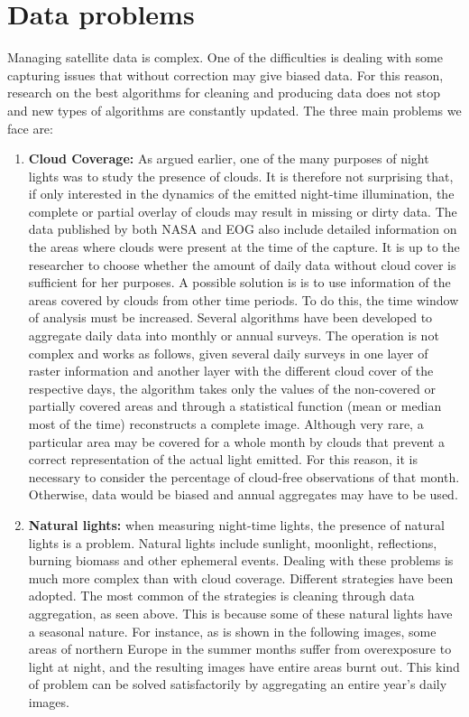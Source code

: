 \section{Data problems}
Managing satellite data is complex. One of the difficulties is dealing with some capturing issues that without correction may give biased data. For this reason, research on the best algorithms for cleaning and producing data does not stop and new types of algorithms are constantly updated. The three main problems we face are:
\begin{enumerate}
\item \textbf{Cloud Coverage:} As argued earlier, one of the many purposes of night lights was to study the presence of clouds. It is therefore not surprising that, if only interested in the dynamics of the emitted night-time illumination, the complete or partial overlay of clouds may result in missing or dirty data. 
The data published by both NASA and EOG also include detailed information on the areas where clouds were present at the time of the capture. It is up to the researcher to choose whether the amount of daily data without cloud cover is sufficient for her purposes. 
A possible solution is is to use information of the areas covered by clouds from other time periods. To do this, the time window of analysis must be increased. Several algorithms have been developed to aggregate daily data into monthly or annual surveys. 
The operation is not complex and works as follows, given several daily surveys in one layer of raster information and another layer with the different cloud cover of the respective days, the algorithm takes only the values of the non-covered or partially covered areas and through a statistical function (mean or median most of the time) reconstructs a complete image.
Although very rare, a particular area may be covered for a whole month by clouds that prevent a correct representation of the actual light emitted. For this reason, it is necessary to consider the percentage of cloud-free observations of that month. Otherwise, data would be biased and annual aggregates may have to be used.
\item \textbf{Natural lights:} when measuring night-time lights, the presence of natural lights is a problem. Natural lights include sunlight, moonlight, reflections, burning biomass and other ephemeral events.
Dealing with these problems is much more complex than with cloud coverage. Different strategies have been adopted.
The most common of the strategies is cleaning through data aggregation, as seen above. This is because some of these natural lights have a seasonal nature. For instance, as is shown in the following images, some areas of northern Europe in the summer months suffer from overexposure to light at night, and the resulting images have entire areas burnt out. This kind of problem can be solved satisfactorily by aggregating an entire year's daily images.

\end{enumerate}
